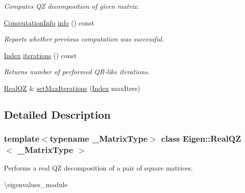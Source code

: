 \begin{DoxyCompactItemize}
\begin{DoxyCompactList}\small\item\em Computes QZ decomposition of given matrix. \end{DoxyCompactList}\item 
\mbox{\hyperlink{group__enums_ga85fad7b87587764e5cf6b513a9e0ee5e}{Computation\+Info}} \mbox{\hyperlink{class_eigen_1_1_real_q_z_a36bd77afed89f3f5c110a715e69e4c64}{info}} () const
\begin{DoxyCompactList}\small\item\em Reports whether previous computation was successful. \end{DoxyCompactList}\item 
\mbox{\label{class_eigen_1_1_real_q_z_afbecc6d0ab1de42be9db79428da48ab6}} 
\mbox{\hyperlink{class_eigen_1_1_real_q_z_a6201e534e901b5f4e66f72c176b534a3}{Index}} \mbox{\hyperlink{class_eigen_1_1_real_q_z_afbecc6d0ab1de42be9db79428da48ab6}{iterations}} () const
\begin{DoxyCompactList}\small\item\em Returns number of performed Q\+R-\/like iterations. \end{DoxyCompactList}\item 
\mbox{\hyperlink{class_eigen_1_1_real_q_z}{Real\+QZ}} \& \mbox{\hyperlink{class_eigen_1_1_real_q_z_a30ae65666b1757e4a2b6a28eaec12226}{set\+Max\+Iterations}} (\mbox{\hyperlink{class_eigen_1_1_real_q_z_a6201e534e901b5f4e66f72c176b534a3}{Index}} max\+Iters)
\end{DoxyCompactItemize}


\subsection{Detailed Description}
\subsubsection*{template$<$typename \+\_\+\+Matrix\+Type$>$\newline
class Eigen\+::\+Real\+Q\+Z$<$ \+\_\+\+Matrix\+Type $>$}

Performs a real QZ decomposition of a pair of square matrices. 

\textbackslash{}eigenvalues\+\_\+module


